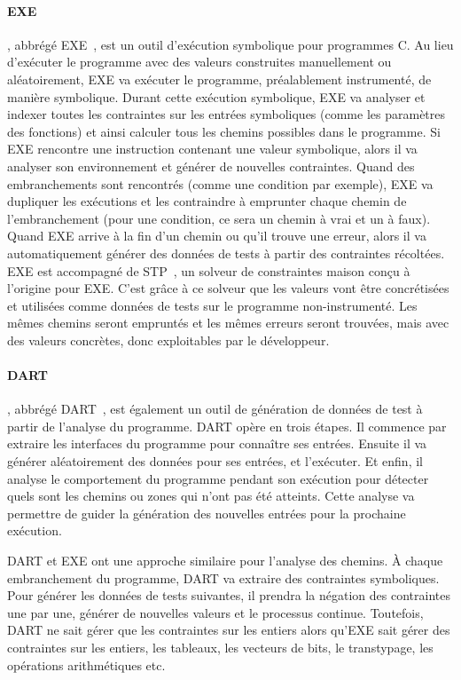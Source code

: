 \paragraph{EXE} , abbrégé
EXE~, est un outil d'exécution symbolique pour
programmes C.  Au lieu d'exécuter le programme avec des valeurs construites
manuellement ou aléatoirement, EXE va exécuter le programme, préalablement
instrumenté, de manière symbolique. Durant cette exécution symbolique, EXE va
analyser et indexer toutes les contraintes sur les entrées symboliques (comme
les paramètres des fonctions) et ainsi calculer tous les chemins possibles dans
le programme.  Si EXE rencontre une instruction contenant une valeur symbolique,
alors il va analyser son environnement et générer de nouvelles contraintes.
Quand des embranchements sont rencontrés (comme une condition par exemple), EXE
va dupliquer les exécutions et les contraindre à emprunter chaque chemin de
l'embranchement (pour une condition, ce sera un chemin à vrai et un à faux).
Quand EXE arrive à la fin d'un chemin ou qu'il trouve une erreur, alors il va
automatiquement générer des données de tests à partir des contraintes récoltées.
EXE est accompagné de STP~, un solveur de constraintes maison
conçu à l'origine pour EXE. C'est grâce à ce solveur que les valeurs vont être
concrétisées et utilisées comme données de tests sur le programme
non-instrumenté. Les mêmes chemins seront empruntés et les mêmes erreurs seront
trouvées, mais avec des valeurs concrètes, donc exploitables par le développeur.

\paragraph{DART} , abbrégé
DART~, est également un outil de génération de données de
test à partir de l'analyse du programme. DART opère en trois étapes. Il
commence par extraire les interfaces du programme pour connaître ses
entrées. Ensuite il va générer aléatoirement des données pour ses entrées, et
l'exécuter. Et enfin, il analyse le comportement du programme pendant son
exécution pour détecter quels sont les chemins ou zones qui n'ont pas été
atteints. Cette analyse va permettre de guider la génération des nouvelles
entrées pour la prochaine exécution.

DART et EXE ont une approche similaire pour l'analyse des chemins. À chaque
embranchement du programme, DART va extraire des contraintes symboliques. Pour
générer les données de tests suivantes, il prendra la négation des contraintes
une par une, générer de nouvelles valeurs et le processus continue. Toutefois,
DART ne sait gérer que les contraintes sur les entiers alors qu'EXE sait gérer
des contraintes sur les entiers, les tableaux, les vecteurs de bits, le
transtypage, les opérations arithmétiques etc.

